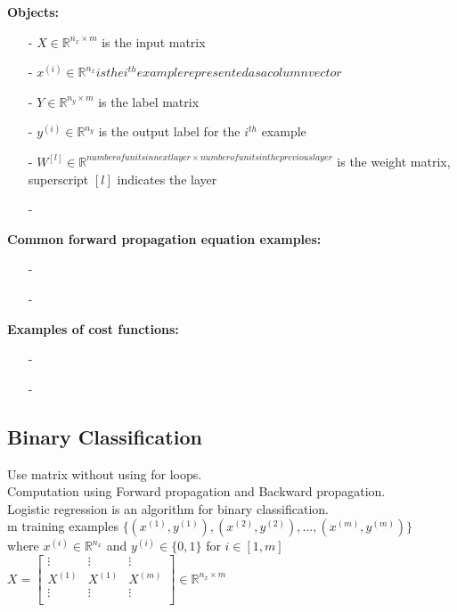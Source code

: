 \documentclass{article}
\begin{document}
\textbf{Objects:}
\begin{itemize}
    \item[-]{$X \in \mathbb{R}^{n_x \times m}$ is the input matrix}
    \item[-]{$x^{(i)} \in \mathbb{R}^{n_x} is the i^{th} example represented as a column vector $}
    \item[-]{$Y \in \mathbb{R}^{n_y \times m}$ is the label matrix}
    \item[-]{$y^{(i)} \in \mathbb{R}^{n_y}$ is the output label for the $i^{th}$ example}
    \item[-]{$W^{[l]} \in \mathbb{R}^{number of units in next layer \times number of units in the previous layer}$ is the weight matrix, superscript $[l]$ indicates the layer}
    \item[-]{}
\end{itemize}

\textbf{Common forward propagation equation examples:}
\begin{itemize}
    \item[-]{}
    \item[-]{}
\end{itemize}

\textbf{Examples of cost functions:}
\begin{itemize}
    \item[-]{}
    \item[-]{}
\end{itemize}

\newpage

\subsection{Binary Classification}

Use matrix without using for loops.\\
Computation using Forward propagation and Backward propagation.\\
Logistic regression is an algorithm for binary classification.\\

m training examples
$\{(x^{(1)}, y^{(1)}), (x^{(2)}, y^{(2)}), \hdots, (x^{(m)}, y^{(m)})\}$ \\
where $x^{(i)} \in \mathbb{R}^{n_x}$ and $y^{(i)} \in \{0,1\}$ for $i \in [1,m]$ \\

$X =
\begin{bmatrix}
    \vdots & \vdots & \vdots \\
    X^{(1)} & X^{(1)} & X^{(m)} \\
    \vdots & \vdots & \vdots \\
\end{bmatrix}
\in \mathbb{R}^{n_x \times m}
$\\
\end{document}
